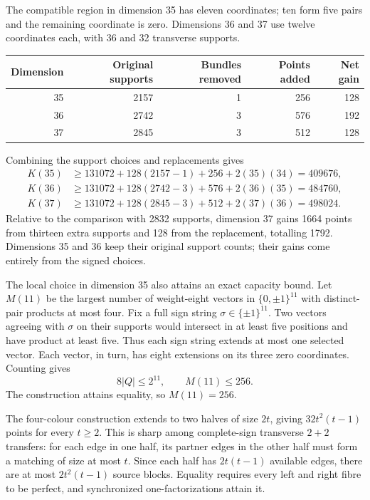 The compatible region in dimension 35 has eleven coordinates; ten form
five pairs and the remaining coordinate is zero. Dimensions 36 and 37
use twelve coordinates each, with 36 and 32 transverse supports.
\begin{center}
\begin{minipage}{\linewidth}\centering
{}
\label{tab:signed-replacements}
\begin{tabular}{rrrrr}
\toprule
Dimension & Original supports & Bundles removed & Points added & Net gain\\
\midrule
35&2157&1&256&128\\
36&2742&3&576&192\\
37&2845&3&512&128\\
\bottomrule
\end{tabular}
\end{minipage}
\end{center}
Combining the support choices and replacements gives
\begin{align*}
K(35)&\ge131072+128(2157-1)+256+2(35)(34)=409676,\\
K(36)&\ge131072+128(2742-3)+576+2(36)(35)=484760,\\
K(37)&\ge131072+128(2845-3)+512+2(37)(36)=498024.
\end{align*}
Relative to the comparison with 2832 supports, dimension 37 gains 1664
points from thirteen extra supports and 128 from the replacement, totalling
1792. Dimensions 35 and 36 keep their original support counts; their
gains come entirely from the signed choices.

The local choice in dimension 35 also attains an exact capacity bound.
Let $M(11)$ be the largest number of weight-eight vectors in
$\{0,\pm1\}^{11}$ with distinct-pair products at most four.
Fix a full sign string $\sigma\in\{\pm1\}^{11}$. Two vectors agreeing
with $\sigma$ on their supports would intersect in at least five
positions and have product at least five. Thus each sign string
extends at most one selected vector. Each vector, in turn, has eight
extensions on its three zero coordinates. Counting gives
\[
8|Q|\le2^{11},\qquad M(11)\le256.
\]
The construction attains equality, so $M(11)=256$.

The four-colour construction extends to two halves of size $2t$,
giving $32t^2(t-1)$ points for every $t\ge2$. This is sharp among
complete-sign transverse $2+2$ transfers: for each edge in one half,
its partner edges in the other half must form a matching of size at
most $t$. Since each half has $2t(t-1)$ available edges, there are at
most $2t^2(t-1)$ source blocks. Equality requires every left and right
fibre to be perfect, and synchronized one-factorizations attain it.

